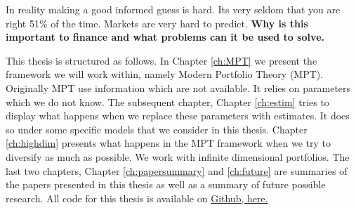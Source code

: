 In reality making a good informed guess is hard.
Its very seldom that you are right 51\% of the time.
Markets are very hard to predict.
\textbf{Why is this important to finance and what problems can it be used to solve.}

This thesis is structured as follows. 
In Chapter \ref{ch:MPT} we present the framework we will work within, namely \citet{markowitz1959portfolio} Modern Portfolio Theory (MPT). 
Originally MPT use information which are not available. 
It relies on parameters which we do not know. 
The subsequent chapter, Chapter \ref{ch:estim} tries to display what happens when we replace these parameters with estimates.
It does so under some specific models that we consider in this thesis.
Chapter \ref{ch:highdim} presents what happens in the MPT framework when we try to diversify as much as possible.
We work with infinite dimensional portfolios.
The last two chapters, Chapter \ref{ch:papersummary} and \ref{ch:future} are summaries of the papers presented in this thesis as well as a summary of future possible research.
All code for this thesis is available on \href{https://github.com/Ethorsn/Phd-thesis}{Github, here.}
